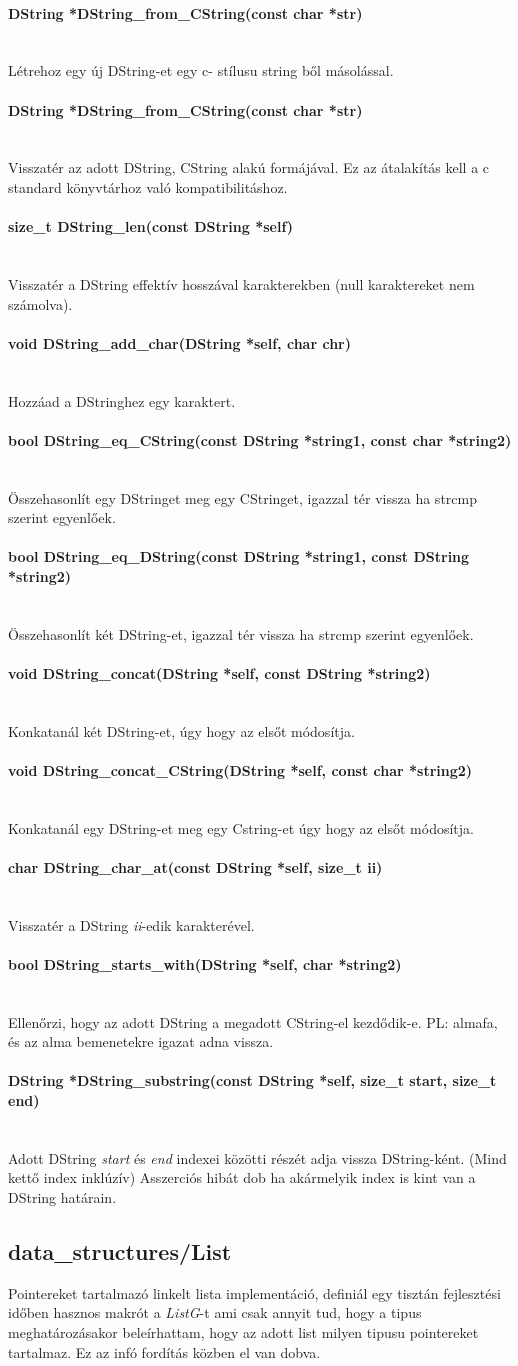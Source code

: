\documentclass{article}[12pt,a4paper]
\newcommand{\lang}[1]{\textit{#1}}
\newcommand{\fn}[1]{\paragraph{#1}\mbox{}\\}
\begin{document}
    \fn{DString *DString\_from\_CString(const char *str)}
    Létrehoz egy új DString-et egy c- stílusu string ből másolással.

    \fn{DString *DString\_from\_CString(const char *str)}
    Visszatér az adott DString, CString alakú formájával.
    Ez az átalakítás kell a c standard könyvtárhoz való kompatibilitáshoz.

    \fn{size\_t DString\_len(const DString *self)}
    Visszatér a DString effektív hosszával karakterekben (null karaktereket nem számolva).

    \fn{void DString\_add\_char(DString *self, char chr)}
    Hozzáad a DStringhez egy karaktert.

    \fn{bool DString\_eq\_CString(const DString *string1, const char *string2)}
    Összehasonlít egy DStringet meg egy CStringet, igazzal tér vissza ha strcmp szerint egyenlőek.

    \fn{bool DString\_eq\_DString(const DString *string1, const DString *string2)}
    Összehasonlít két DString-et, igazzal tér vissza ha strcmp szerint egyenlőek.

    \fn{void DString\_concat(DString *self, const DString *string2)}
    Konkatanál két DString-et, úgy hogy az elsőt módosítja.

    \fn{void DString\_concat\_CString(DString *self, const char *string2)}
    Konkatanál egy DString-et meg egy Cstring-et úgy hogy az elsőt módosítja.

    \fn{char DString\_char\_at(const DString *self, size\_t ii)}
    Visszatér a DString \textit{ii}-edik karakterével.

    \fn{bool DString\_starts\_with(DString *self, char *string2)}
    Ellenőrzi, hogy az adott DString a megadott CString-el kezdődik-e.
    PL: almafa, és az alma bemenetekre igazat adna vissza.

    \fn{DString *DString\_substring(const DString *self, size\_t start, size\_t end)}
    Adott DString \textit{start} és \textit{end} indexei közötti részét adja vissza DString-ként. (Mind kettő index inklúzív)
    Asszerciós hibát dob ha akármelyik index is kint van a DString határain.

    \subsection{data\_structures/List}
    Pointereket tartalmazó linkelt lista implementáció, definiál egy tisztán fejlesztési időben hasznos makrót a \lang{ListG}-t ami csak annyit tud, hogy a tipus meghatározásakor beleírhattam, hogy az adott list milyen tipusu pointereket tartalmaz.
    Ez az infó fordítás közben el van dobva.
\end{document}
